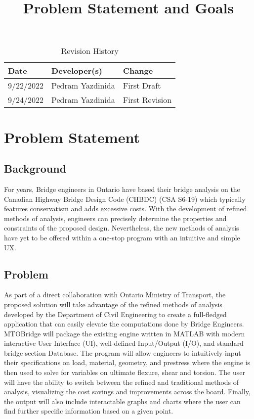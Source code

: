 \documentclass{article}
\title{Problem Statement and Goals\\\progname}
\author{\authname}
\date{}
\begin{document}
\maketitle

\begin{table}[hp]
\caption{Revision History} \label{TblRevisionHistory}
\begin{tabularx}{\textwidth}{llX}
\toprule
\textbf{Date} & \textbf{Developer(s)} & \textbf{Change}\\
\midrule
9/22/2022 & Pedram Yazdinida & First Draft\\
9/24/2022 & Pedram Yazdinida & First Revision\\
\bottomrule
\end{tabularx}
\end{table}

\section{Problem Statement}

\subsection{Background}

For years, Bridge engineers in Ontario have based their bridge analysis on the Canadian Highway Bridge Design Code (CHBDC) (CSA S6-19) which typically features conservatism and adds excessive costs. With the development of refined methods of analysis, engineers can precisely determine the properties and constraints of the proposed design. Nevertheless, the new methods of analysis have yet to be offered within a one-stop program with an intuitive and simple UX. 

\subsection{Problem}

As part of a direct collaboration with Ontario Ministry of Transport, the proposed solution will take advantage of the refined methods of analysis developed by the Department of Civil Engineering to create a full-fledged application that can easily elevate the computations done by Bridge Engineers. MTOBridge will package the existing engine written in MATLAB with modern interactive User Interface (UI), well-defined Input/Output (I/O), and standard bridge section Database. The program will allow engineers to intuitively input their specifications on load, material, geometry, and prestress where the engine is then used to solve for variables on ultimate flexure, shear and torsion. The user will have the ability to switch between the refined and traditional methods of analysis, visualizing the cost savings and improvements across the board. Finally, the output will also include interactable graphs and charts where the user can find further specific information based on a given point. 
\end{document}
